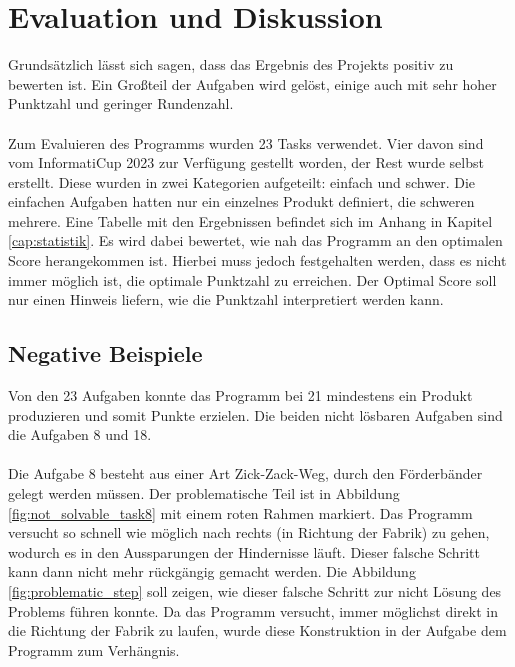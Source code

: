 \section{Evaluation und Diskussion}\label{cap:evaluation}
Grundsätzlich lässt sich sagen, dass das Ergebnis des Projekts positiv zu bewerten ist. Ein Großteil der Aufgaben wird gelöst, einige auch mit sehr hoher Punktzahl und geringer Rundenzahl.
\\\\
Zum Evaluieren des Programms wurden 23 Tasks verwendet. Vier davon sind vom InformatiCup 2023 zur Verfügung gestellt worden, der Rest wurde selbst erstellt. Diese wurden in zwei Kategorien aufgeteilt: einfach und schwer. Die einfachen Aufgaben hatten nur ein einzelnes Produkt definiert, die schweren mehrere. Eine Tabelle mit den Ergebnissen befindet sich im Anhang in Kapitel \ref{cap:statistik}. Es wird dabei bewertet, wie nah das Programm an den optimalen Score herangekommen ist. Hierbei muss jedoch festgehalten werden, dass es nicht immer möglich ist, die optimale Punktzahl zu erreichen. Der Optimal Score soll nur einen Hinweis liefern, wie die Punktzahl interpretiert werden kann. 

\subsection*{Negative Beispiele}
Von den 23 Aufgaben konnte das Programm bei 21 mindestens ein Produkt produzieren und somit Punkte erzielen. Die beiden nicht lösbaren Aufgaben sind die Aufgaben 8 und 18.\\\\
Die Aufgabe 8 besteht aus einer Art Zick-Zack-Weg, durch den Förderbänder gelegt werden müssen. Der problematische Teil ist in Abbildung \ref{fig:not_solvable_task8} mit einem roten Rahmen markiert. Das Programm versucht so schnell wie möglich nach rechts (in Richtung der Fabrik) zu gehen, wodurch es in den Aussparungen der Hindernisse läuft. Dieser falsche Schritt kann dann nicht mehr rückgängig gemacht werden. Die Abbildung \ref{fig:problematic_step} soll zeigen, wie dieser falsche Schritt zur nicht Lösung des Problems führen konnte.
Da das Programm versucht, immer möglichst direkt in die Richtung der Fabrik zu laufen, wurde diese Konstruktion in der Aufgabe dem Programm zum Verhängnis.
\begin{verbatim}
	
	
\end{verbatim}


